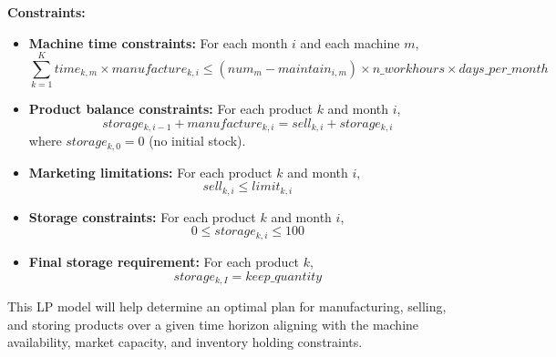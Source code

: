 \documentclass{article}
\begin{document}
\textbf{Constraints:}

\begin{itemize}
    \item \textbf{Machine time constraints:} For each month $i$ and each machine $m$,
    \[
    \sum_{k=1}^{K} time_{k, m} \times manufacture_{k, i} \leq (num_{m} - maintain_{i, m}) \times n\_workhours \times days\_per\_month
    \]

    \item \textbf{Product balance constraints:} For each product $k$ and month $i$,
    \[
    storage_{k, i-1} + manufacture_{k, i} = sell_{k, i} + storage_{k, i}
    \]
    where $storage_{k, 0} = 0$ (no initial stock).

    \item \textbf{Marketing limitations:} For each product $k$ and month $i$,
    \[
    sell_{k, i} \leq limit_{k, i}
    \]

    \item \textbf{Storage constraints:} For each product $k$ and month $i$,
    \[
    0 \leq storage_{k, i} \leq 100
    \]

    \item \textbf{Final storage requirement:} For each product $k$,
    \[
    storage_{k, I} = keep\_quantity
    \]
\end{itemize}

This LP model will help determine an optimal plan for manufacturing, selling, and storing products over a given time horizon aligning with the machine availability, market capacity, and inventory holding constraints.
\end{document}
